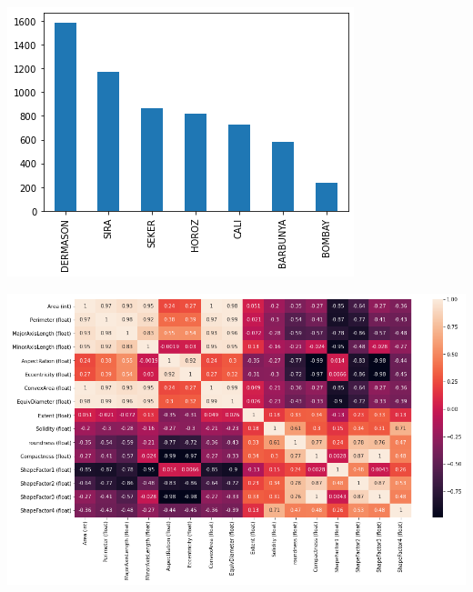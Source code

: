 \documentclass[12pt]{extarticle}
\begin{document}
\begin{minipage}{.45\textwidth}
\vspace*{-5mm}
\begin{center}
\includegraphics[width=\linewidth]{./.ob-jupyter/0e36c24725fa023c6e39f07bc9df640645c86811.png}
\end{center}
\label{fig:barchart}
\end{minipage}
\begin{minipage}{.55\textwidth}
\vspace*{-5mm}
\begin{center}
\includegraphics[width=\linewidth]{./.ob-jupyter/da88383af5d1618a3cb0bf8008eb6ce0c4c86bce.png}
\end{center}
\label{fig:heatmap}
\end{minipage}
\end{document}
